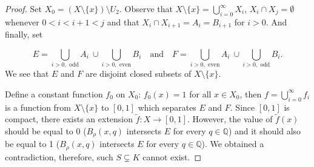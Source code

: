 \begin{proof}
    Set $X_0 = (X\setminus \{x\})\setminus U_2$. Observe that $X\setminus \{x\} = \bigcup_{i=0}^\infty X_i$, $X_i\cap X_j = \emptyset$ whenever $0<i<i+1<j$ and that $X_i\cap X_{i+1} = A_i = B_{i+1}$ for $i>0$.
    And finally, set

    $$ E = \bigcup_{i>0, \text{ odd}} A_i ~\cup \bigcup_{i>0, \text{ even}} B_i\quad\text{and}\quad F = \bigcup_{i>0, \text{ even}} A_i ~\cup \bigcup_{i>0, \text{ odd}} B_i. $$
    We see that $E$ and $F$ are disjoint closed subsets of $X\setminus \{x\}$.

    Define a constant function $f_0$ on $X_0$: $f_0(x) = 1$ for all $x\in X_0$, then $ f = \bigcup_{i=0}^{\infty} f_i $ is a function from $X\setminus \{x\}$ to $[0,1]$ which separates $E$ and $F$. Since $[0,1]$ is compact, there exists an extension $\tilde f\colon X \to [0,1]$. However, the value of $\tilde f(x)$ should be equal to 0 ($B_\rho(x,q)$ intersects $E$ for every $q\in \mathbb Q$) and it should also be equal to 1 ($B_\rho(x,q)$ intersects $E$ for every $q\in \mathbb Q$). We obtained a contradiction, therefore, such $S\subsetneq K$ cannot exist.
\end{proof}

